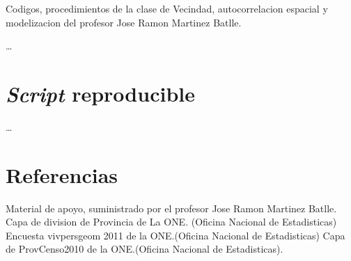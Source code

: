\documentclass[11pt,]{article}
\begin{document}
Codigos, procedimientos de la clase de Vecindad, autocorrelacion
espacial y modelizacion del profesor Jose Ramon Martinez Batlle.

\ldots

\section{\texorpdfstring{\emph{Script}
reproducible}{Script reproducible}}\label{script-reproducible-2}

\ldots

\section{Referencias}\label{referencias-2}

Material de apoyo, suministrado por el profesor Jose Ramon Martinez
Batlle. Capa de division de Provincia de La ONE. (Oficina Nacional de
Estadisticas) Encuesta vivpersgeom 2011 de la ONE.(Oficina Nacional de
Estadisticas) Capa de ProvCenso2010 de la ONE.(Oficina Nacional de
Estadisticas).




\newpage
\singlespacing 
\end{document}
